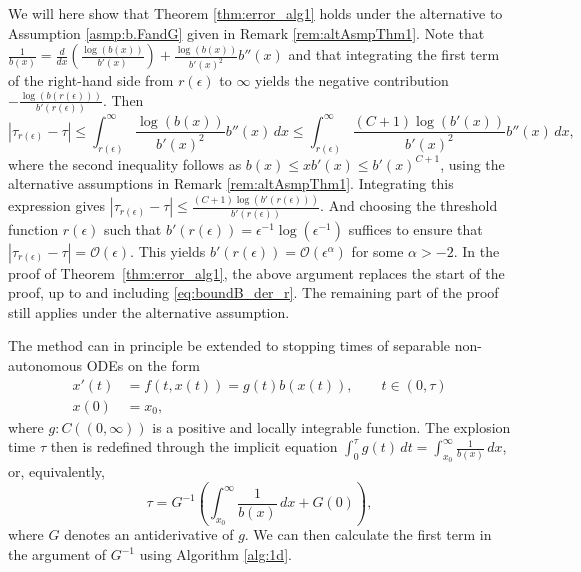 \documentclass[a4paper, oneside, reqno]{amsart}
\newcommand{\abs}[1]{\left\lvert#1\right\rvert}
\theoremstyle{remark}
\begin{document}
\begin{remark}
\label{rem:followAltAsmpThm1}
    We will here show that Theorem \ref{thm:error_alg1} holds under the alternative to Assumption \ref{asmp:b.FandG} given in Remark \ref{rem:altAsmpThm1}.
    Note that \(\frac{1}{b(x)} = \frac{d}{dx}\left(\frac{\log(b(x))}{b'(x)}\right) + \frac{\log(b(x))}{b'(x)^2}b''(x)\) and that integrating the first term of the right-hand side from \(r(\epsilon)\) to \(\infty\) yields the negative contribution \(-\frac{\log(b(r(\epsilon)))}{b'(r(\epsilon))}\).
    Then
    \[\abs{\tau_{r(\epsilon)} - \tau} \leq \int_{r(\epsilon)}^\infty \frac{\log(b(x))}{b'(x)^2}b''(x)\, dx \leq \int_{r(\epsilon)}^\infty \frac{(C+ 1 )\log(b'(x))}{b'(x)^2}b''(x)\, dx,\]
    where the second inequality follows as \(b(x) \leq xb'(x) \leq b'(x)^{C+1}\), using the alternative assumptions in Remark \ref{rem:altAsmpThm1}. 
    Integrating this expression gives \(\abs{\tau_{r(\epsilon)}-\tau}\leq\frac{(C+1)\log(b'(r(\epsilon)))}{b'(r(\epsilon))}\). And 
    choosing the threshold function $r(\epsilon)$ such that 
    \(b'(r(\epsilon)) = \epsilon^{-1}\log(\epsilon^{-1})\) suffices to ensure that \(\abs{\tau_{r(\epsilon)}-\tau} = \mathcal{O}(\epsilon)\).
    This yields \(b'(r(\epsilon)) = \mathcal{O}(\epsilon^\alpha)\) for some \(\alpha>-2\). 
    In the proof of Theorem~\ref{thm:error_alg1}, the above argument replaces the start of the proof, up to and including \eqref{eq:boundB_der_r}. The remaining part of the proof still applies under the alternative assumption. 
\end{remark}

\begin{remark}
\label{rem:seperableODEs}
The method can in principle be extended to stopping times of separable non-autonomous ODEs on the form
\begin{equation*}
\begin{split}
    x'(t) &= f(t, x(t)) = g(t)b(x(t)), \qquad t \in (0, \tau)\\
    x(0) &= x_0,
\end{split}
\end{equation*}
where \(g:C((0,\infty))\) is a positive and locally integrable function. 
The explosion time $\tau$ then is redefined through the implicit equation 
\(\int_0^\tau g(t)\,dt = \int_{x_0}^\infty \frac{1}{b(x)}\,dx\), or, equivalently, 
\[
\tau = G^{-1}\left(\int_{x_0}^\infty \frac{1}{b(x)}\,dx + G(0)\right),
\]
where \(G\) denotes an antiderivative of \(g\).
We can then calculate the first term in the argument of \(G^{-1}\) using Algorithm \ref{alg:1d}.
\end{remark}
\end{document}
